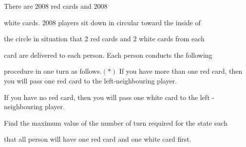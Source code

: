 There are 2008 red cards and 2008

 white cards. 2008  players sit down in circular toward the inside of 

the circle in situation that 2 red cards and 2 white cards from each 

card are delivered to each person. Each person conducts the following 

procedure in one turn as follows.$ (*)$ If you have more than one red card, then you will pass one red card to the left-neighbouring player.

If you have no red card, then you will pass one white card to the left -neighbouring player.

Find the maximum value of the number of turn required for the state such

 that all person will have one red card and one white card first.